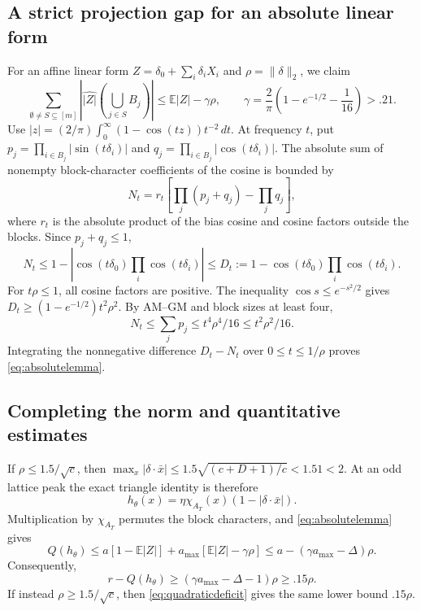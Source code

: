 \documentclass[11pt]{article}
\newcommand{\E}{\mathbb E}
\begin{document}
\subsection{A strict projection gap for an absolute linear form}

For an affine linear form $Z=\delta_0+\sum_i\delta_iX_i$ and
$\rho=\|\delta\|_2$, we claim
\begin{equation}\label{eq:absolutelemma}
 \sum_{\emptyset\ne S\subseteq[m]}
       \left|\widehat{|Z|}\!\left(\bigcup_{j\in S}B_j\right)\right|
       \le\E|Z|-\gamma\rho,
 \qquad
 \gamma=\frac2\pi\left(1-e^{-1/2}-\frac1{16}\right)>.21.
\end{equation}
Use
$|z|=(2/\pi)\int_0^\infty(1-\cos(tz))t^{-2}\,dt$.
At frequency $t$, put
$p_j=\prod_{i\in B_j}|\sin(t\delta_i)|$ and
$q_j=\prod_{i\in B_j}|\cos(t\delta_i)|$.
The absolute sum of nonempty block-character coefficients of the
cosine is bounded by
\[
 N_t=r_t\left[\prod_j(p_j+q_j)-\prod_jq_j\right],
\]
where $r_t$ is the absolute product of the bias cosine and cosine
factors outside the blocks. Since $p_j+q_j\le1$,
\[
 N_t\le1-|\cos(t\delta_0)\prod_i\cos(t\delta_i)|
 \le D_t:=1-\cos(t\delta_0)\prod_i\cos(t\delta_i).
\]
For $t\rho\le1$, all cosine factors are positive. The inequality
$\cos s\le e^{-s^2/2}$ gives
$D_t\ge(1-e^{-1/2})t^2\rho^2$. By AM--GM and block sizes at least
four,
\[
 N_t\le\sum_jp_j\le t^4\rho^4/16\le t^2\rho^2/16.
\]
Integrating the nonnegative difference $D_t-N_t$ over
$0\le t\le1/\rho$ proves \eqref{eq:absolutelemma}.

\subsection{Completing the norm and quantitative estimates}

If $\rho\le1.5/\sqrt c$, then
$\max_x|\delta\cdot\bar x|\le1.5\sqrt{(c+D+1)/c}<1.51<2$.
At an odd lattice peak the exact triangle identity is therefore
\[
 h_\theta(x)=\eta\chi_{A_T}(x)(1-|\delta\cdot\bar x|).
\]
Multiplication by $\chi_{A_T}$ permutes the block characters, and
\eqref{eq:absolutelemma} gives
\[
 Q(h_\theta)\le a[1-\E|Z|]+a_{\max}[\E|Z|-\gamma\rho]
    \le a-(\gamma a_{\max}-\Delta)\rho.
\]
Consequently,
\begin{equation}\label{eq:smallrho}
 r-Q(h_\theta)\ge(\gamma a_{\max}-\Delta-1)\rho\ge.15\rho.
\end{equation}
If instead $\rho\ge1.5/\sqrt c$, then
\eqref{eq:quadraticdeficit} gives the same lower bound $.15\rho$.
\end{document}
